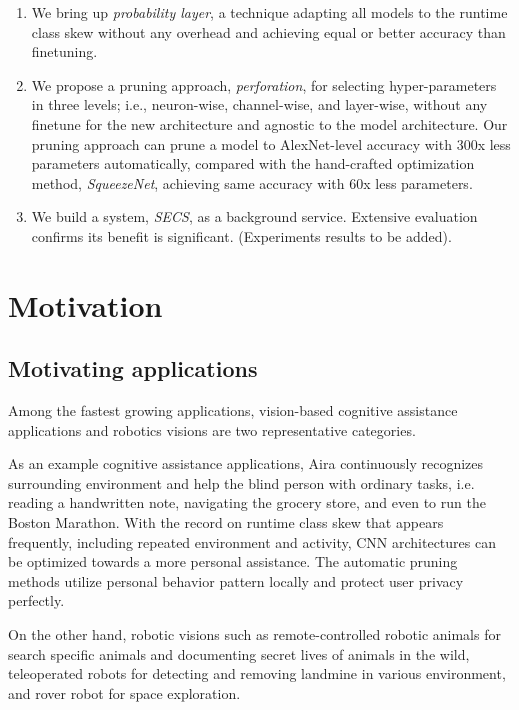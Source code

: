 \documentclass[pageno]{jpaper}
\begin{document}
\begin{enumerate}
  \item We bring up \textit{probability layer}, a technique adapting all models to the runtime class skew without any overhead and achieving equal or better accuracy than finetuning.
  \item We propose a pruning approach, \textit{perforation}, for selecting hyper-parameters in three levels; i.e., neuron-wise, channel-wise, and layer-wise, without any finetune for the new architecture and agnostic to the model architecture. Our pruning approach can prune a model to AlexNet-level accuracy with 300x less parameters automatically, compared with the hand-crafted optimization method, \textit{SqueezeNet}, achieving same accuracy with 60x less parameters.
  \item We build a system, \textit{SECS}, as a background service. Extensive evaluation confirms its benefit is significant. (Experiments results to be added). 
\end{enumerate}







\section{Motivation}
\subsection{Motivating applications}
Among the fastest growing applications, vision-based cognitive assistance applications and robotics visions are two representative categories.

As an example cognitive assistance applications, Aira \cite{aria2018} continuously recognizes surrounding environment and help the blind person with ordinary tasks, i.e. reading a handwritten note, navigating the grocery store, and even to run the Boston Marathon. With the record on runtime class skew that appears frequently, including repeated environment and activity, CNN architectures can be optimized towards a more personal assistance. The automatic pruning methods utilize personal behavior pattern locally and protect user privacy perfectly.

On the other hand, robotic visions such as remote-controlled robotic animals \cite{bbc2018} for search specific animals and documenting secret lives of animals in the wild, teleoperated robots \cite{landmine2018} for detecting and removing landmine in various environment, and rover robot \cite{rover2018} for space exploration. 
\end{document}

